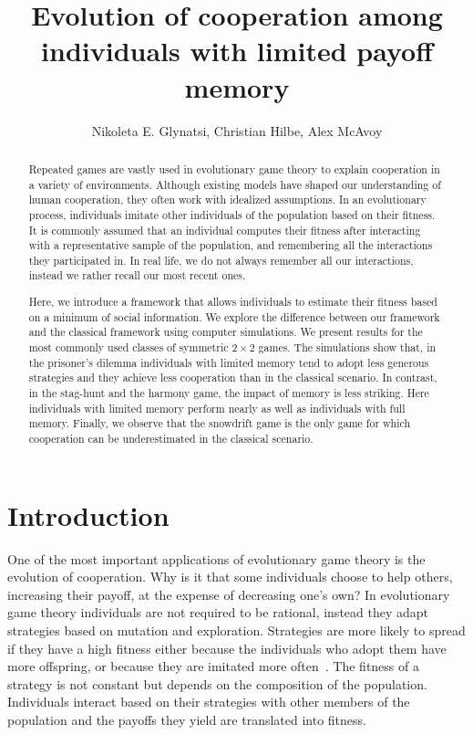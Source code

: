 \documentclass[11pt]{article}
\title{
\bf  \sffamily \LARGE Evolution of cooperation among individuals with limited payoff memory\\}
\date{}
\author{Nikoleta E. Glynatsi, Christian Hilbe, Alex McAvoy}
\theoremstyle{plainCl1}
\theoremstyle{plainCl2}
\begin{document}
\maketitle

\begin{abstract}
Repeated games are vastly used in evolutionary game theory to explain cooperation in a variety of environments. Although existing models have shaped our understanding of human cooperation, they often work with idealized
assumptions. In an evolutionary process, individuals imitate other individuals
of the population based on their fitness. It is commonly assumed that an
individual computes their fitness after interacting with a representative sample
of the population, and remembering all the interactions they participated in. In
real life, we do not always remember all our interactions, instead we rather
recall our most recent ones.

Here, we introduce a framework that allows individuals to estimate their fitness
based on a minimum of social information. We explore the difference between our
framework and the classical framework using computer simulations. We present results for
the most commonly used classes of symmetric \(2 \times 2\) games. The
simulations show that, in the prisoner's dilemma individuals with limited memory
tend to adopt less generous strategies and they achieve less cooperation than in
the classical scenario. In contrast, in the stag-hunt and the harmony game, the
impact of memory is less striking. Here individuals with limited memory perform
nearly as well as individuals with full memory. Finally, we observe that the
snowdrift game is the only game for which cooperation can be underestimated in
the classical scenario.
\end{abstract}

\section{Introduction}

One of the most important applications of evolutionary game theory is the
evolution of cooperation. Why is it that some individuals choose to help others,
increasing their payoff, at the expense of decreasing one's own? In evolutionary
game theory individuals are not required to be rational, instead they adapt
strategies based on mutation and exploration. Strategies are more likely to
spread if they have a high fitness either because the individuals who adopt them
have more offspring, or because they are imitated more often~\cite{Wu2015}. The
fitness of a strategy is not constant but depends on the composition of the
population. Individuals interact based on their strategies with other members of
the population and the payoffs they yield are translated into fitness.
\end{document}
